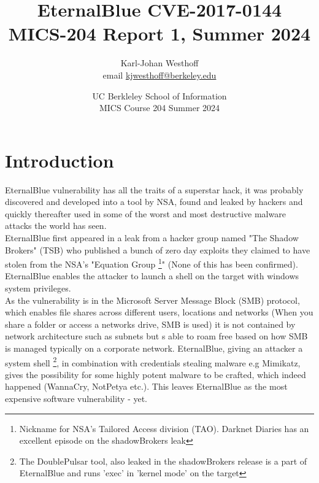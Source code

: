 \documentclass[
	letterpaper, %
	10pt, %
	unnumberedsections, %
	twoside, %
]{LTJournalArticle}
\title{EternalBlue CVE-2017-0144 \\ MICS-204 Report 1, Summer 2024} %
\author{
	Karl-Johan Westhoff \\
	email \href{mailto:kjwesthoff@berkeley.edu}{kjwesthoff@berkeley.edu}
}
\date{UC Berkleley School of Information \\
MICS Course 204 Summer 2024
}
\begin{document}
\maketitle %


\section{Introduction}
EternalBlue \cite[CVE-2017-0144]{CVE-2017-0144} vulnerability has all the traits of a superstar hack, it was probably discovered and developed into a tool by NSA, found and leaked by hackers and quickly thereafter used in some of the worst and most destructive malware attacks the world has seen. \\
\newline
EternalBlue first appeared in a leak\cite{Rapid7-on-S0hadow-Broker-Leak} from a hacker group named "The Shadow Brokers"\cite{shadowBrokers-wiki} (TSB) who published a bunch of zero day exploits they claimed to have stolen from the NSA's "Equation Group \footnote{Nickname for NSA’s Tailored Access division (TAO). Darknet Diaries \cite{Darknet-Diaries-ep53} has an excellent episode on the shadowBrokers leak}"\cite{kaspersky-eq-group} (None of this has been confirmed). \\
\newline
EternalBlue enables the attacker to launch a shell on the target with windows system privileges. \\
\newline
As the vulnerability is in the Microsoft Server Message Block (SMB) protocol, which enables file shares across different users, locations and networks (When you share a folder or access a networks drive, SMB is used) it is not contained by network architecture such as subnets but s able to roam free based on how SMB is managed typically on a corporate network. EternalBlue, giving an attacker a system shell \footnote{The DoublePulsar tool, also leaked in the shadowBrokers release is a part of EternalBlue and runs 'exec' in 'kernel mode' on the target}, in combination with credentials stealing malware e.g Mimikatz, gives the possibility for some highly potent malware to be crafted, which indeed happened (WannaCry, NotPetya etc.). This leaves EternalBlue as the most expensive software vulnerability - yet. 
\end{document}
